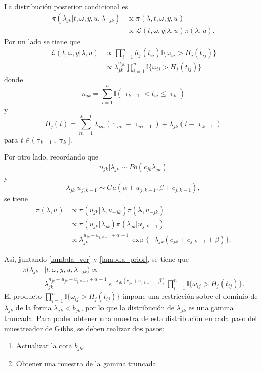 \documentclass[11pt,a4paper]{article}
\begin{document}
La distribución posterior condicional es
\begin{align*}
\pi(\lambda_{jk} | t, \omega, y, u, \lambda_{-jk}) &\propto \pi(\lambda, t, \omega, y, u)\\
&\propto \mathcal{L}(t, \omega, y | \lambda, u) \pi(\lambda, u).
\end{align*}
Por un lado se tiene que
\begin{align} \label{lambda_ver}
\mathcal{L}(t, \omega, y | \lambda, u) &\propto \prod_{i = 1}^n h_j(t_{ij}) \mathbb{I}\lbrace \omega_{ij} > H_j(t_{ij}) \rbrace \nonumber\\
&\propto \lambda_{jk}^{n_{jk}} \prod_{i = 1}^n \mathbb{I}\lbrace \omega_{ij} > H_j(t_{ij}) \rbrace
\end{align}
donde $$n_{jk} = \sum_{i=1}^n \mathbb{I}(\uptau_{k-1} < t_{ij} \leq \uptau_k)$$ y $$H_j(t) = \sum_{m = 1}^{k-1} \lambda_{jm}(\uptau_m - \uptau_{m-1}) + \lambda_{jk}(t - \uptau_{k-1})$$ para $t\in (\uptau_{k-1}, \uptau_k].$

Por otro lado, recordando que $$u_{jk}|\lambda_{jk} \sim Po(c_{jk}\lambda_{jk})$$ y $$\lambda_{jk}|u_{j,k-1} \sim Ga(\alpha + u_{j, k-1}, \beta + c_{j,k-1}),$$ se tiene
\begin{align}
\pi(\lambda, u) &\propto \pi(u_{jk} | \lambda, u_{-jk})\pi(\lambda, u_{-jk}) \nonumber \\
&\propto \pi(u_{jk} | \lambda_{jk})\pi(\lambda_{jk}| u_{j, k-1}) \nonumber \\
&\propto \lambda_{jk}^{u_{jk} + u_{j, k-1} + \alpha - 1} \ \exp\lbrace-\lambda_{jk}(c_{jk} + c_{j, k-1} + \beta)\rbrace. \label{lambda_prior}
\end{align}

Así, juntando \eqref{lambda_ver} y \eqref{lambda_prior}, se tiene que
\begin{align*}
\pi(\lambda_{jk} &| t, \omega, y, u, \lambda_{-jk}) \propto\\
&\lambda_{jk}^{n_{jk} + u_{jk} + u_{j, k-1} + \alpha - 1} \ e^{-\lambda_{jk}(c_{jk} + c_{j, k-1} + \beta)} \prod_{i=1}^n \mathbb{I}\lbrace \omega_{ij} > H_j(t_{ij}) \rbrace.
\end{align*}
El producto $\prod_{i=1}^n \mathbb{I}\lbrace \omega_{ij} > H_j(t_{ij}) \rbrace$ impone una restricción sobre el dominio de $\lambda_{jk}$ de la forma $\lambda_{jk} < b_{jk}$, por lo que la distribución de $\lambda_{jk}$ es una gamma truncada. Para poder obtener una muestra de esta distribución en cada paso del muestreador de Gibbs, se deben realizar dos pasos:
\begin{enumerate}
\item Actualizar la cota $b_{jk}.$
\item Obtener una muestra de la gamma truncada.
\end{enumerate}
\end{document}
